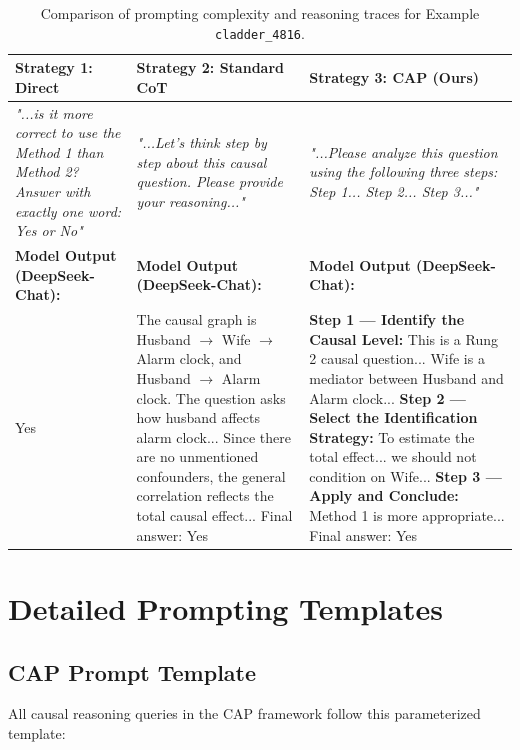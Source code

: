 \documentclass{article}
\theoremstyle{plain}
\theoremstyle{definition}
\theoremstyle{remark}
\begin{document}
\begin{table}[ht]
\centering
\small
\begin{tabular}{p{}p{}p{}}
\toprule
\textbf{Strategy 1: Direct} & \textbf{Strategy 2: Standard CoT} & \textbf{Strategy 3: CAP (Ours)} \\
\midrule
\textit{"...is it more correct to use the Method 1 than Method 2? Answer with exactly one word: Yes or No"} & \textit{"...Let's think step by step about this causal question. Please provide your reasoning..."} & \textit{"...Please analyze this question using the following three steps: Step 1... Step 2... Step 3..."} \\
\midrule
\textbf{Model Output (DeepSeek-Chat):} & \textbf{Model Output (DeepSeek-Chat):} & \textbf{Model Output (DeepSeek-Chat):} \\
Yes & The causal graph is Husband $\rightarrow$ Wife $\rightarrow$ Alarm clock, and Husband $\rightarrow$ Alarm clock. The question asks how husband affects alarm clock... Since there are no unmentioned confounders, the general correlation reflects the total causal effect... Final answer: Yes & \textbf{Step 1 — Identify the Causal Level:} This is a Rung 2 causal question... Wife is a mediator between Husband and Alarm clock... \textbf{Step 2 — Select the Identification Strategy:} To estimate the total effect... we should not condition on Wife... \textbf{Step 3 — Apply and Conclude:} Method 1 is more appropriate... Final answer: Yes \\
\bottomrule
\end{tabular}
\caption{Comparison of prompting complexity and reasoning traces for Example \texttt{cladder\_4816}.}
\end{table}

\section{Detailed Prompting Templates}
\label{appendix:prompts}

\subsection{CAP Prompt Template}
\label{appendix:template}
All causal reasoning queries in the CAP framework follow this parameterized template:
\end{document}
